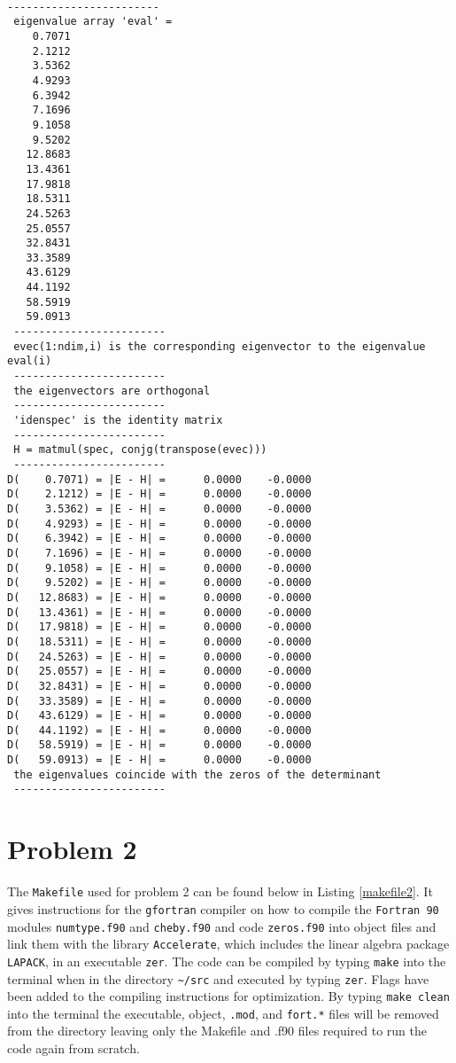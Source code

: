 \documentclass[12pt]{article}
\begin{document}
\begin{lstlisting}[frame=single,caption={Selected parts of output of {\tt Fortran 90} Code {\tt hrmosc.f90} for {\tt ndim} = 20},label=out3]

------------------------
 eigenvalue array 'eval' =
    0.7071
    2.1212
    3.5362
    4.9293
    6.3942
    7.1696
    9.1058
    9.5202
   12.8683
   13.4361
   17.9818
   18.5311
   24.5263
   25.0557
   32.8431
   33.3589
   43.6129
   44.1192
   58.5919
   59.0913
 ------------------------
 evec(1:ndim,i) is the corresponding eigenvector to the eigenvalue eval(i)
 ------------------------
 the eigenvectors are orthogonal
 ------------------------
 'idenspec' is the identity matrix
 ------------------------
 H = matmul(spec, conjg(transpose(evec)))
 ------------------------
D(    0.7071) = |E - H| =      0.0000    -0.0000
D(    2.1212) = |E - H| =      0.0000    -0.0000
D(    3.5362) = |E - H| =      0.0000    -0.0000
D(    4.9293) = |E - H| =      0.0000    -0.0000
D(    6.3942) = |E - H| =      0.0000    -0.0000
D(    7.1696) = |E - H| =      0.0000    -0.0000
D(    9.1058) = |E - H| =      0.0000    -0.0000
D(    9.5202) = |E - H| =      0.0000    -0.0000
D(   12.8683) = |E - H| =      0.0000    -0.0000
D(   13.4361) = |E - H| =      0.0000    -0.0000
D(   17.9818) = |E - H| =      0.0000    -0.0000
D(   18.5311) = |E - H| =      0.0000    -0.0000
D(   24.5263) = |E - H| =      0.0000    -0.0000
D(   25.0557) = |E - H| =      0.0000    -0.0000
D(   32.8431) = |E - H| =      0.0000    -0.0000
D(   33.3589) = |E - H| =      0.0000    -0.0000
D(   43.6129) = |E - H| =      0.0000    -0.0000
D(   44.1192) = |E - H| =      0.0000    -0.0000
D(   58.5919) = |E - H| =      0.0000    -0.0000
D(   59.0913) = |E - H| =      0.0000    -0.0000
 the eigenvalues coincide with the zeros of the determinant
 ------------------------

\end{lstlisting}

\section{Problem 2}

The {\tt Makefile} used for problem 2 can be found below in Listing \ref{makefile2}.  It gives instructions for the {\tt gfortran} compiler on how to compile the {\tt Fortran 90} modules {\tt numtype.f90} and {\tt cheby.f90} and code {\tt zeros.f90} into object files and link them with the library {\tt Accelerate}, which includes the linear algebra package {\tt LAPACK}, in an executable {\tt zer}.  The code can be compiled by typing {\tt make} into the terminal when in the directory {\tt \verb|~/src|} and executed by typing {\tt zer}.  Flags have been added to the compiling instructions for optimization.  By typing {\tt make clean} into the terminal the executable, object, {\tt *.mod}, and {\tt fort.*} files will be removed from the directory leaving only the Makefile and .f90 files required to run the code again from scratch.
\end{document}
